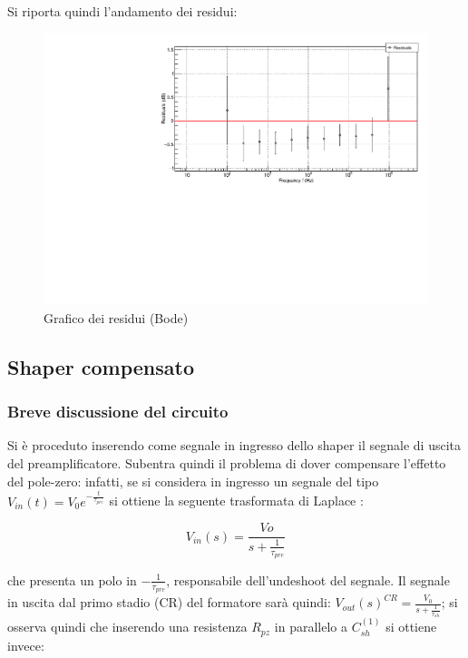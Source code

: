 \documentclass{article}
\begin{document}
Si riporta quindi l'andamento dei residui:
\begin{center}
    \begin{figure}[H]
    \centering
    \includegraphics[scale=0.3875, angle=0]{bodeshaperresidui_no_pz.pdf}
    \caption{ Grafico dei residui (Bode)}
    \label{fig:bodeshaperresidui_no_pz}
    \end{figure}
\end{center}

\subsection{Shaper compensato}
\subsubsection{Breve discussione del circuito}
Si è proceduto inserendo come segnale in ingresso dello shaper il segnale di uscita del preamplificatore. Subentra quindi il problema 
di dover compensare l'effetto del pole-zero: infatti, se si considera in ingresso un segnale del tipo 
$V_{in}(t)=V_0 e^{-\frac{t}{\tau_{pre}}}$ si ottiene la seguente trasformata di Laplace :

\begin{equation}
    V_{in}(s)=\frac{Vo}{s+\frac{1}{\tau_{pre}}}    
\end{equation}

che presenta un polo in $-\frac{1}{\tau_{pre}} $,  responsabile dell’undeshoot del segnale.
Il segnale in uscita dal primo stadio (CR) del formatore sarà quindi: $V_{out}(s)^{CR}=\frac{V_{0}}{s+\frac{1}{\tau_{sh}}}$;
si osserva quindi che inserendo una resistenza $R_{pz}$ in parallelo a $C_{sh}^{(1)}$ si ottiene invece:
\end{document}
